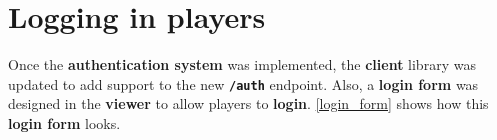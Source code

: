 \documentclass[a4paper,11pt,titlepage,abstract,numbers=noenddot,automark,mnsy,intlimits,rgb,dvipsnames]{report}
\begin{document}
\section{Logging in players}
Once the \textbf{authentication system} was implemented, the \textbf{client} library was updated to add support to the new \textbf{\texttt{/auth}}
endpoint. Also, a \textbf{login form} was designed in the \textbf{viewer} to allow players to \textbf{login}. \autoref{login_form}
shows how this \textbf{login form} looks.
\begin{figure}[H]
\end{figure}
\end{document}
